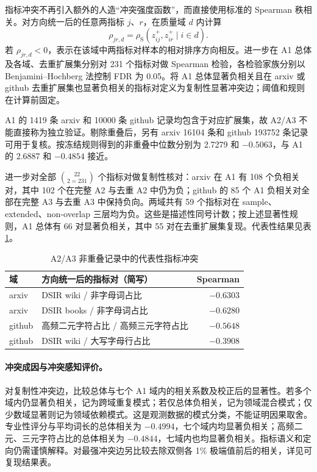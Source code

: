 指标冲突不再引入额外的人造“冲突强度函数”，而直接使用标准的 Spearman 秩相关。对方向统一后的任意两指标 $j$、$r$，在质量域 $d$ 内计算
\begin{equation}
\rho_{jr,d}
=
\rho_{\mathrm S}(z^+_{ij},z^+_{ir}\mid i\in d).
\label{eq:q1_pair_spearman}
\end{equation}
若 $\rho_{jr,d}<0$，表示在该域中两指标对样本的相对排序方向相反。进一步在 A1 总体及各域、去重扩展集分别对 231 个指标对做 Spearman 检验，各检验家族分别以 Benjamini--Hochberg 法控制 FDR 为 0.05。将 A1 总体显著负相关且在 arxiv 或 github 去重扩展集也显著负相关的指标对定义为复制性显著冲突边；阈值和规则在计算前固定。

A1 的 1419 条 arxiv 和 10000 条 github 记录均包含于对应扩展集，故 A2/A3 不能直接称为独立验证。剔除重叠后，另有 arxiv 16104 条和 github 193752 条记录可用于复核。按冻结规则得到的非重叠中位数分别为 2.7279 和 $-0.5063$，与 A1 的 2.6887 和 $-0.4854$ 接近。

进一步对全部 $22\choose2=231$ 个指标对做复制性核对：arxiv 在 A1 有 108 个负相关对，其中 102 个在完整 A2 与去重 A2 中仍为负；github 的 85 个 A1 负相关对全部在完整 A3 与去重 A3 中保持负向。两域共有 59 个指标对在 sample、extended、non-overlap 三层均为负。这些是描述性同号计数；按上述显著性规则，A1 总体有 66 对显著负相关，其中 55 对在去重扩展集复现。代表性结果见表\ref{tab:q1_conflict}。

\begin{table}[htbp]
\centering\small
\caption{A2/A3 非重叠记录中的代表性指标冲突}
\label{tab:q1_conflict}
\begin{tabular}{llr}
\toprule
域 & 方向统一后的指标对（简写） & Spearman \\
\midrule
arxiv & DSIR wiki / 非字母词占比 & $-0.6303$ \\
arxiv & DSIR books / 非字母词占比 & $-0.6280$ \\
github & 高频二元字符占比 / 高频三元字符占比 & $-0.5648$ \\
github & DSIR wiki / 大写字母行占比 & $-0.3908$ \\
\bottomrule
\end{tabular}
\end{table}

\paragraph{冲突成因与冲突感知评价。} 对复制性冲突边，比较总体与七个 A1 域内的相关系数及校正后的显著性。若多个域内仍显著负相关，记为跨域重复模式；若仅总体负相关，记为领域混合模式；仅少数域显著则记为领域依赖模式。这是观测数据的模式分类，不能证明因果取舍。专业性评分与平均词长的总体相关为 $-0.4994$，七个域内均显著负相关；高频二元、三元字符占比的总体相关为 $-0.4844$，七域内也均显著负相关。指标语义和定向仍需谨慎解释。对最强冲突边另比较去除双侧各 1\% 极端值前后的相关，详见可复现结果表。

